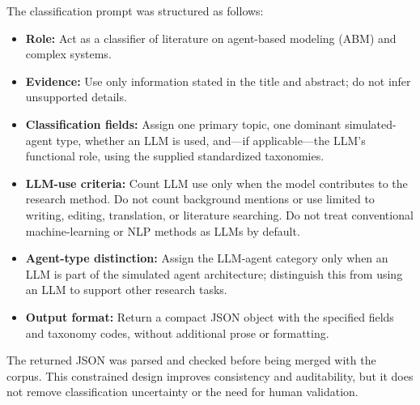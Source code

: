 The classification prompt was structured as follows:

\begin{itemize}[leftmargin=1.6em,itemsep=2pt,topsep=3pt]

\item \textbf{Role:} Act as a classifier of literature on agent-based modeling (ABM) and complex systems.

\item \textbf{Evidence:} Use only information stated in the title and abstract; do not infer unsupported details.

\item \textbf{Classification fields:} Assign one primary topic, one dominant simulated-agent type, whether an LLM is used, and—if applicable—the LLM’s functional role, using the supplied standardized taxonomies.

\item \textbf{LLM-use criteria:} Count LLM use only when the model contributes to the research method. Do not count background mentions or use limited to writing, editing, translation, or literature searching. Do not treat conventional machine-learning or NLP methods as LLMs by default.

\item \textbf{Agent-type distinction:} Assign the LLM-agent category only when an LLM is part of the simulated agent architecture; distinguish this from using an LLM to support other research tasks.

\item \textbf{Output format:} Return a compact JSON object with the specified fields and taxonomy codes, without additional prose or formatting.

\end{itemize}

The returned JSON was parsed and checked before being merged with the corpus. This constrained design improves consistency and auditability, but it does not remove classification uncertainty or the need for human validation.
